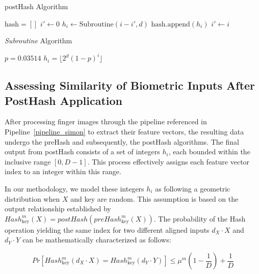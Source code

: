 \begin{algorithm}
    \begin{algorithmic}[1]
    \caption{postHash Algorithm}
    \label{postHash Algorithm}
    \State $\text{hash} = []$
    \State $i' \gets 0$
        \State $h_i \gets \text{Subroutine}(i - i', d)$
        \State $\text{hash.append}(h_i)$
        \State $i' \gets i$
    \EndFor 
    \State {}
    \EndFunction
    \end{algorithmic}
    \end{algorithm}
    
    \begin{algorithm}
    \begin{algorithmic}[1]
    \caption{\textit{Subroutine} Algorithm}
    \label{Subroutine Algorithm}
    \State $p = 0.03514$
    \State $h_i = \lfloor 2^d (1-p)^{i} \rfloor$
    \State {}
    \EndFunction
    \end{algorithmic}
    \end{algorithm}

\subsection{Assessing Similarity of Biometric Inputs After PostHash Application}
\label{sec:q}

After processing finger images through the pipeline referenced in Pipeline~\ref{pipeline_simon} to extract their feature vectors, the resulting data undergo the preHash and subsequently, the postHash algorithms. The final output from postHash consists of a set of integers \( h_i \), each bounded within the inclusive range \([0, D-1]\). This process effectively assigns each feature vector index to an integer within this range.

In our methodology, we model these integers \( h_i \) as following a geometric distribution when \(X\) and key are random. This assumption is based on the output relationship established by \( Hash_{\text{key}}^m(X) = postHash(preHash_{\text{key}}^m(X)) \). The probability of the Hash operation yielding the same index for two different aligned inputs \(d_X \cdot X\) and \(d_Y \cdot Y\) can be mathematically characterized as follows:

\[Pr[Hash_{\text{key}}^m(d_X \cdot X) = Hash_{\text{key}}^m(d_Y \cdot Y)] \leq \mu^m(1 - \frac{1}{D}) + \frac{1}{D}\]

